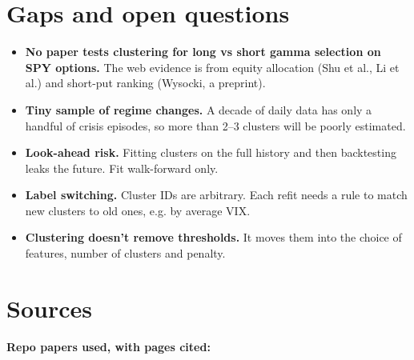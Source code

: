 \documentclass{article}
\begin{document}
\section{Gaps and open questions}

\begin{itemize}

\item \textbf{No paper tests clustering for long vs short gamma selection on SPY options.} The web evidence is from equity allocation (Shu et al., Li et al.) and short-put ranking (Wysocki, a preprint).

\item \textbf{Tiny sample of regime changes.} A decade of daily data has only a handful of crisis episodes, so more than 2--3 clusters will be poorly estimated.

\item \textbf{Look-ahead risk.} Fitting clusters on the full history and then backtesting leaks the future. Fit walk-forward only.

\item \textbf{Label switching.} Cluster IDs are arbitrary. Each refit needs a rule to match new clusters to old ones, e.g. by average VIX.

\item \textbf{Clustering doesn't remove thresholds.} It moves them into the choice of features, number of clusters and penalty.

\end{itemize}

\section{Sources}

\textbf{Repo papers used, with pages cited:}
\end{document}
